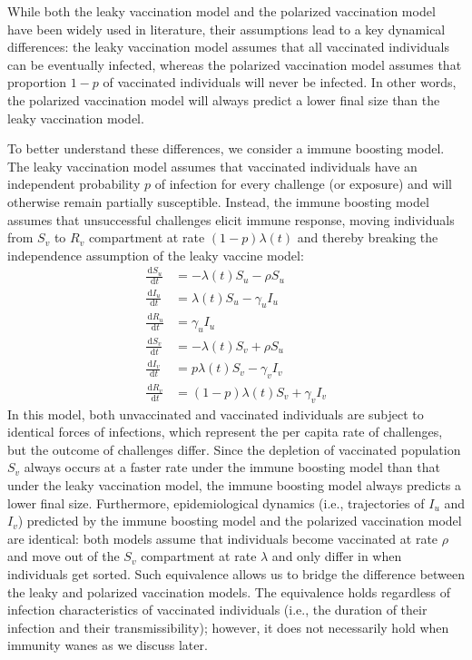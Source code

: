 \documentclass[12pt]{article}
\newcommand{\dd}[1]{\ensuremath{\, \mathrm{d}#1}}
\begin{document}
While both the leaky vaccination model and the polarized vaccination model have been widely used in literature, their assumptions lead to a key dynamical differences: the leaky vaccination model assumes that all vaccinated individuals can be eventually infected, whereas the polarized vaccination model assumes that proportion $1-p$ of vaccinated individuals will never be infected.
In other words, the polarized vaccination model will always predict a lower final size than the leaky vaccination model.

To better understand these differences, we consider a immune boosting model.
The leaky vaccination model assumes that vaccinated individuals have an independent probability $p$ of infection for every challenge (or exposure) and will otherwise remain partially susceptible.
Instead, the immune boosting model assumes that unsuccessful challenges elicit immune response, moving individuals from $S_v$ to $R_v$ compartment at rate $(1-p) \lambda(t)$ and thereby breaking the independence assumption of the leaky vaccine model:  
\begin{align}
\frac{\dd S_u}{\dd t} &= - \lambda(t) S_u - \rho S_u \\
\frac{\dd I_u}{\dd t} &= \lambda(t) S_u - \gamma_u I_u \\
\frac{\dd R_u}{\dd t} &= \gamma_u I_u \\
\frac{\dd S_v}{\dd t} &= - \lambda(t) S_v + \rho S_u \\
\frac{\dd I_v}{\dd t} &= p \lambda(t) S_v - \gamma_v I_v \\
\frac{\dd R_v}{\dd t} &= (1-p) \lambda(t) S_v + \gamma_v I_v
\end{align}
In this model, both unvaccinated and vaccinated individuals are subject to identical forces of infections, which represent the per capita rate of challenges, but the outcome of challenges differ.
Since the depletion of vaccinated population $S_v$ always occurs at a faster rate under the immune boosting model than that under the leaky vaccination model, the immune boosting model always predicts a lower final size.
Furthermore, epidemiological dynamics (i.e., trajectories of $I_u$ and $I_v$) predicted by the immune boosting model and the polarized vaccination model are identical: 
both models assume that individuals become vaccinated at rate $\rho$ and move out of the $S_v$ compartment at rate $\lambda$ and only differ in when individuals get sorted.
Such equivalence allows us to bridge the difference between the leaky and polarized vaccination models.
The equivalence holds regardless of infection characteristics of vaccinated individuals (i.e., the duration of their infection and their transmissibility);
however, it does not necessarily hold when immunity wanes as we discuss later.
\end{document}
